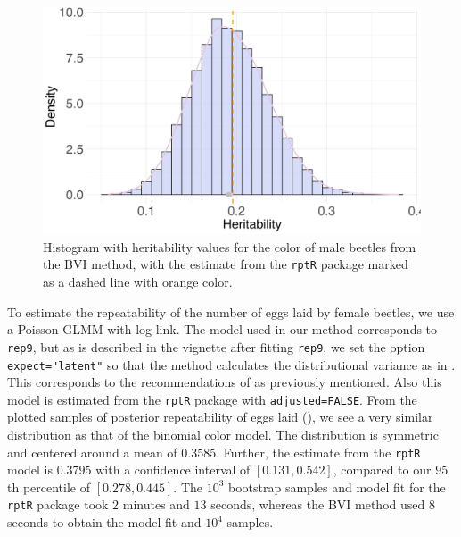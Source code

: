 \begin{figure}[H]
  \centering
  \includegraphics[width=1\linewidth]{Figures/Stoffel Comparison/Heritability_colour_binomial.png}
  \caption[Estimated repeatability of color in male beetles]{Histogram with heritability values for the color of male beetles from the BVI method, with the estimate from the \texttt{rptR} package marked as a dashed line with orange color.}
  \label{fig:heritability_colour_binomial}
\end{figure}
\noindent To estimate the repeatability of the number of eggs laid by female beetles, we use a Poisson GLMM with log-link. The model used in our method corresponds to \texttt{rep9}, but as is described in the vignette after fitting \texttt{rep9}, we set the option \texttt{expect="latent"} so that the method calculates the distributional variance as in . This corresponds to the recommendations of \citet{nakagawa2017} as previously mentioned. Also this model is estimated from the \texttt{rptR} package with \texttt{adjusted=FALSE}. From the plotted samples of posterior repeatability of eggs laid (), we see a very similar distribution as that of the binomial color model. The distribution is symmetric and centered around a mean of $0.3585$. Further, the estimate from the \texttt{rptR} model is $0.3795$ with a confidence interval of $[0.131, 0.542]$, compared to our $95$th percentile of $[0.278, 0.445]$. The $10^3$ bootstrap samples and model fit for the \texttt{rptR} package took $2$ minutes and $13$ seconds, whereas the BVI method used $8$ seconds to obtain the model fit and $10^4$ samples.
